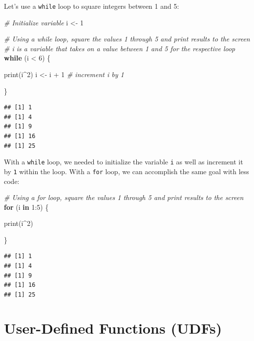 \documentclass[
]{book}
\newenvironment{Shaded}{\begin{snugshade}}{\end{snugshade}}
\newcommand{\CommentTok}[1]{\textcolor[rgb]{0.56,0.35,0.01}{\textit{#1}}}
\newcommand{\ControlFlowTok}[1]{\textcolor[rgb]{0.13,0.29,0.53}{\textbf{#1}}}
\newcommand{\DecValTok}[1]{\textcolor[rgb]{0.00,0.00,0.81}{#1}}
\newcommand{\FunctionTok}[1]{\textcolor[rgb]{0.00,0.00,0.00}{#1}}
\newcommand{\NormalTok}[1]{#1}
\newcommand{\OtherTok}[1]{\textcolor[rgb]{0.56,0.35,0.01}{#1}}
\newcommand{\SpecialCharTok}[1]{\textcolor[rgb]{0.00,0.00,0.00}{#1}}
\begin{document}
Let's use a \texttt{while} loop to square integers between 1 and 5:

\begin{Shaded}
\begin{Highlighting}[]
\CommentTok{\# Initialize variable}
\NormalTok{i }\OtherTok{\textless{}{-}} \DecValTok{1}

\CommentTok{\# Using a \textquotesingle{}while\textquotesingle{} loop, square the values 1 through 5 and print results to the screen}
\CommentTok{\# \textquotesingle{}i\textquotesingle{} is a variable that takes on a value between 1 and 5 for the respective loop}
\ControlFlowTok{while}\NormalTok{ (i }\SpecialCharTok{\textless{}} \DecValTok{6}\NormalTok{) \{}
  
  \FunctionTok{print}\NormalTok{(i}\SpecialCharTok{\^{}}\DecValTok{2}\NormalTok{) }
\NormalTok{  i }\OtherTok{\textless{}{-}}\NormalTok{ i }\SpecialCharTok{+} \DecValTok{1} \CommentTok{\# increment i by 1}
  
\NormalTok{\}}
\end{Highlighting}
\end{Shaded}

\begin{verbatim}
## [1] 1
## [1] 4
## [1] 9
## [1] 16
## [1] 25
\end{verbatim}

With a \texttt{while} loop, we needed to initialize the variable \texttt{i} as well as increment it by \texttt{1} within the loop. With a \texttt{for} loop, we can accomplish the same goal with less code:

\begin{Shaded}
\begin{Highlighting}[]
\CommentTok{\# Using a \textquotesingle{}for\textquotesingle{} loop, square the values 1 through 5 and print results to the screen}
\ControlFlowTok{for}\NormalTok{ (i }\ControlFlowTok{in} \DecValTok{1}\SpecialCharTok{:}\DecValTok{5}\NormalTok{) \{ }
  
  \FunctionTok{print}\NormalTok{(i}\SpecialCharTok{\^{}}\DecValTok{2}\NormalTok{)}
  
\NormalTok{\}}
\end{Highlighting}
\end{Shaded}

\begin{verbatim}
## [1] 1
## [1] 4
## [1] 9
## [1] 16
## [1] 25
\end{verbatim}

\hypertarget{user-defined-functions-udfs}{%
\section{User-Defined Functions (UDFs)}\label{user-defined-functions-udfs}}
\end{document}
